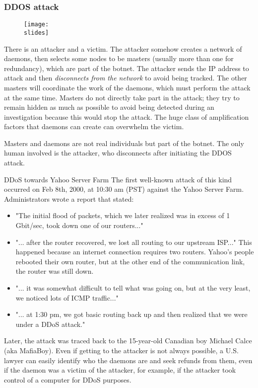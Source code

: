 \subsubsection*{DDOS attack}

\begin{figure}[h]
  \centering
  \texttt{[image: \\slides]}
\end{figure}

There is an attacker and a victim. The attacker somehow creates a network of daemons, then selects some nodes to be masters (usually more than one for redundancy), which are part of the botnet. The attacker sends the IP address to attack and then \emph{disconnects from the network} to avoid being tracked. The other masters will coordinate the work of the daemons, which must perform the attack at the same time. Masters do not directly take part in the attack; they try to remain hidden as much as possible to avoid being detected during an investigation because this would stop the attack. The huge class of amplification factors that daemons can create can overwhelm the victim.

Masters and daemons are not real individuals but part of the botnet. The only human involved is the attacker, who disconnects after initiating the DDOS attack.

\begin{casehistory}{DDoS towards Yahoo Server Farm}
  The first well-known attack of this kind occurred on Feb 8th, 2000, at 10:30 am (PST) against the Yahoo Server Farm. Administrators wrote a report that stated:
  \begin{itemize}
    \item "The initial flood of packets, which we later realized was in excess of 1 Gbit/sec, took down one of our routers..."
    \item "... after the router recovered, we lost all routing to our upstream ISP..." This happened because an internet connection requires two routers. Yahoo's people rebooted their own router, but at the other end of the communication link, the router was still down.
    \item "... it was somewhat difficult to tell what was going on, but at the very least, we noticed lots of ICMP traffic..."
    \item "... at 1:30 pm, we got basic routing back up and then realized that we were under a DDoS attack."
  \end{itemize}
  Later, the attack was traced back to the 15-year-old Canadian boy Michael Calce (aka MafiaBoy). Even if getting to the attacker is not always possible, a U.S. lawyer can easily identify who the daemons are and seek refunds from them, even if the daemon was a victim of the attacker, for example, if the attacker took control of a computer for DDoS purposes.
\end{casehistory}


